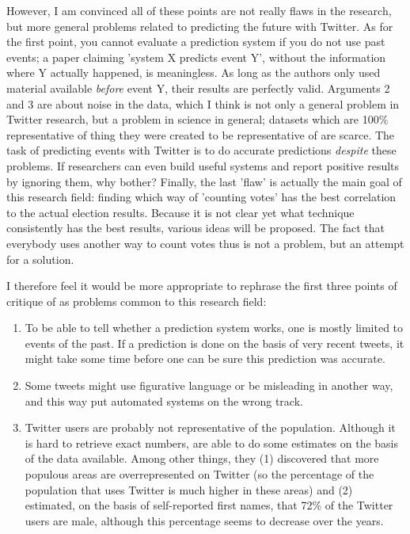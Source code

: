 \documentclass[12pt]{article}
\begin{document}
However, I am convinced all of these points are not really flaws in the research, but more general problems related to predicting the future with Twitter. As for the first point, you cannot evaluate a prediction system if you do not use past events; a paper claiming 'system X predicts event Y', without the information where Y actually happened, is meaningless. As long as the authors only used material available \emph{before} event Y, their results are perfectly valid. Arguments 2 and 3 are about noise in the data, which I think is not only a general problem in Twitter research, but a problem in science in general; datasets which are 100\% representative of thing they were created to be representative of are scarce. The task of predicting events with Twitter is to do accurate predictions \emph{despite} these problems. If researchers can even build useful systems and report positive results by ignoring them, why bother? Finally, the last 'flaw' is actually the main goal of this research field: finding which way of 'counting votes' has the best correlation to the actual election results. Because it is not clear yet what technique consistently has the best results, various ideas will be proposed. The fact that everybody uses another way to count votes thus is not a problem, but an attempt for a solution.

I therefore feel it would be more appropriate to rephrase the first three points of critique of  as problems common to this research field:

\begin{enumerate}
\item To be able to tell whether a prediction system works, one is mostly limited to events of the past. If a prediction is done on the basis of very recent tweets, it might take some time before one can be sure this prediction was accurate.
\item Some tweets might use figurative language or be misleading in another way, and this way put automated systems on the wrong track.
\item Twitter users are probably not representative of the population. Although it is hard to retrieve exact numbers,  are able to do some estimates on the basis of the data available. Among other things, they (1) discovered that more populous areas are overrepresented on Twitter (so the percentage of the population that uses Twitter is much higher in these areas) and (2) estimated, on the basis of self-reported first names, that 72\% of the Twitter users are male, although this percentage seems to decrease over the years.
\end{enumerate}


{}

\end{document}
